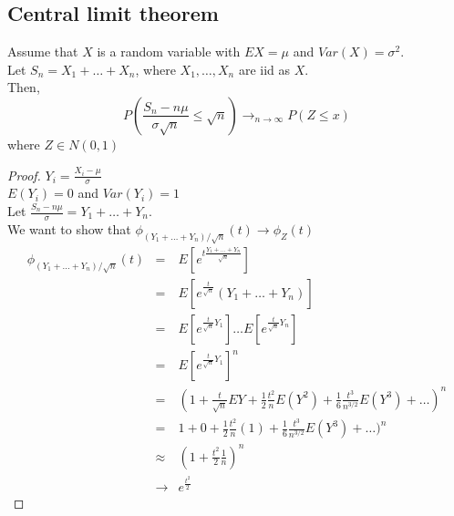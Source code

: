   \subsection*{Central limit theorem}
    Assume that $X$ is a random variable with $EX = \mu$ and $Var(X) = \sigma^2$.\\
    Let $S_n = X_1 + \ldots + X_n$, where $X_1, \ldots, X_n$ are iid as $X$.\\
    Then,
    $$
      P\left(\frac{S_n - n\mu}{\sigma\sqrt{n}} \le \sqrt{n}\right) \to_{n \to \infty}
      P(Z \le x)
    $$
    where $Z \in N(0,1)$
    \begin{proof}
      $Y_i = \frac{X_i - \mu}{\sigma}$\\
      $E(Y_i) = 0$ and $Var(Y_i) = 1$\\
      Let $\frac{S_n - n\mu}{\sigma} = Y_1 + \ldots + Y_n$.\\
      We want to show that $\phi_{(Y_1 + \ldots + Y_n)/\sqrt{n}}(t) \to \phi_Z(t)$\\
      \begin{eqnarray*}
        \phi_{(Y_1 + \ldots + Y_n)/\sqrt{n}}(t) & = &
        E[e^{t \frac{Y_1 + \ldots + Y_n}{\sqrt{n}}}]\\
        & = & E[e^{\frac{t}{\sqrt{n}}}(Y_1 + \ldots + Y_n)]\\
        & = & E[e^{\frac{t}{\sqrt{n}}Y_1}] \ldots E[e^{\frac{t}{\sqrt{n}}Y_n}]\\
        & = & E[e^{\frac{t}{\sqrt{n}}Y_1}]^n\\
        & = & \left(1 + \frac{t}{\sqrt{n}}EY + \frac{1}{2}\frac{t^2}{n} E(Y^2) + 
          \frac{1}{6}\frac{t^3}{n^{3/2}} E(Y^3) + \ldots \right)^n\\
        & = & 1 + 0 + \frac{1}{2}\frac{t^2}{n}(1) + \frac{1}{6}\frac{t^3}{n^{3/2}} E(Y^3) + \ldots)^n\\
        & \approx & (1 + \frac{t^2}{2} \frac{1}{n})^n\\
        & \to & e^{\frac{t^2}{2}}
      \end{eqnarray*}
    \end{proof}
